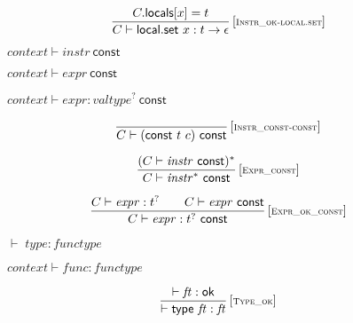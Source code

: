 \documentclass{article}
\begin{document}
$$
\begin{array}{@{}c@{}}\displaystyle
	\frac{
		C{.}\mathsf{locals}{}[x] = t
	}{
		C \vdash \mathsf{local.set}~x : t \rightarrow \epsilon
	} \, {[\textsc{\scriptsize Instr\_ok{-}local.set}]}
	\qquad
\end{array}
$$

\vspace{1ex}

$\boxed{{\mathit{context}} \vdash {\mathit{instr}}~\mathsf{const}}$

$\boxed{{\mathit{context}} \vdash {\mathit{expr}}~\mathsf{const}}$

$\boxed{{\mathit{context}} \vdash {\mathit{expr}} : {{\mathit{valtype}}^?}~\mathsf{const}}$

$$
\begin{array}{@{}c@{}}\displaystyle
	\frac{
	}{
		C \vdash (\mathsf{const}~t~c)~\mathsf{const}
	} \, {[\textsc{\scriptsize Instr\_const{-}const}]}
	\qquad
\end{array}
$$

\vspace{1ex}

$$
\begin{array}{@{}c@{}}\displaystyle
	\frac{
		(C \vdash {\mathit{instr}}~\mathsf{const})^\ast
	}{
		C \vdash {{\mathit{instr}}^\ast}~\mathsf{const}
	} \, {[\textsc{\scriptsize Expr\_const}]}
	\qquad
\end{array}
$$

\vspace{1ex}

$$
\begin{array}{@{}c@{}}\displaystyle
	\frac{
		C \vdash {\mathit{expr}} : {t^?}
		\qquad
		C \vdash {\mathit{expr}}~\mathsf{const}
	}{
		C \vdash {\mathit{expr}} : {t^?}~\mathsf{const}
	} \, {[\textsc{\scriptsize Expr\_ok\_const}]}
	\qquad
\end{array}
$$

\vspace{1ex}

$\boxed{{ \vdash }\;{\mathit{type}} : {\mathit{functype}}}$

$\boxed{{\mathit{context}} \vdash {\mathit{func}} : {\mathit{functype}}}$

\vspace{1ex}

$$
\begin{array}{@{}c@{}}\displaystyle
	\frac{
		{ \vdash }\;{\mathit{ft}} : \mathsf{ok}
	}{
		{ \vdash }\;\mathsf{type}~{\mathit{ft}} : {\mathit{ft}}
	} \, {[\textsc{\scriptsize Type\_ok}]}
	\qquad
\end{array}
$$
\end{document}

